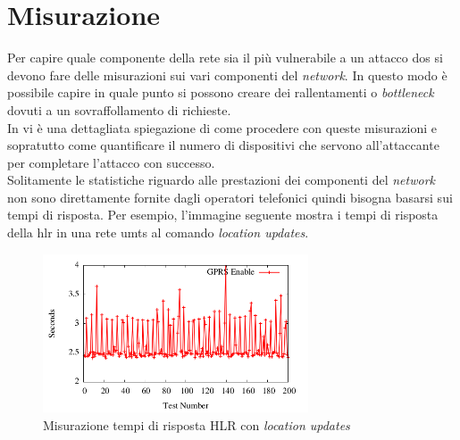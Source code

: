\section{Misurazione}
Per capire quale componente della rete sia il più vulnerabile a un attacco \gls{dos} si devono fare delle misurazioni sui vari componenti del \textit{network}.
In questo modo è possibile capire in quale punto si possono creare dei rallentamenti o \textit{bottleneck} dovuti a un sovraffollamento di richieste.\\
In \cite{measuring-dos} vi è una dettagliata spiegazione di come procedere con queste misurazioni e sopratutto come quantificare il numero di dispositivi che 
servono all'attaccante per completare l'attacco con successo.\\
Solitamente le statistiche riguardo alle prestazioni dei componenti del \textit{network} non sono direttamente fornite dagli operatori telefonici quindi bisogna 
basarsi sui tempi di risposta. Per esempio, l'immagine seguente mostra i tempi di risposta della \gls{hlr} in una rete \gls{umts} al comando \textit{location updates}.
\begin{figure}[h]
    \centering
    \includegraphics[width=0.7\textwidth]{images/hlr-measuring.png}
    \caption{Misurazione tempi di risposta HLR con \textit{location updates}\cite{measuring-dos}}
\end{figure}
